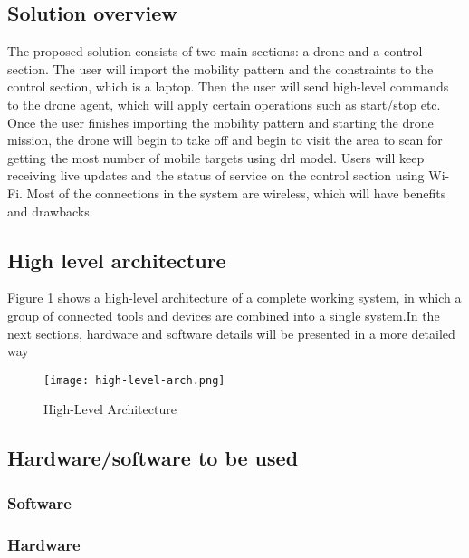 \documentclass[../main.tex]{subfiles}
\begin{document}
\subsection{Solution overview}

The proposed solution consists of two main sections: a drone and a control section. The user will import
the mobility pattern and the constraints to the control section, which is a laptop. Then the user will send high-level commands to the drone agent, which will apply certain operations such as start/stop etc. Once the user finishes importing the mobility pattern and starting the drone mission, the drone will begin to take off and begin to visit the area to scan for getting the most number of mobile targets using \gls{drl} model. Users will keep receiving live updates and the status of service on the control section using Wi-Fi. Most of the connections in the system are wireless, which will have benefits and drawbacks.


\subsection{High level architecture}
Figure 1 shows a high-level architecture of a complete working system, in which a group of connected tools and devices are combined into a single system.In the next sections, hardware and software details will be presented in a more detailed way
\begin{figure}[H]
	\centering
	\texttt{[image: high-level-arch.png]}
	\caption{High-Level Architecture}\label{fig1:arch-fig}
\end{figure}


\subsection{Hardware/software to be used}

\subsubsection{Software}

\subsubsection{Hardware}
\end{document}
